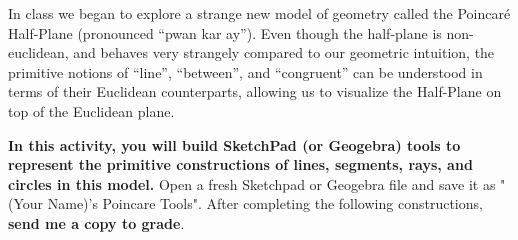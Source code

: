\documentclass{article}
\begin{document}
\HomeworkTitle[class={College Geometry}, number={2}, name={Poincar\'{e} Half-Plane}]

In class we began to explore a strange new model of geometry called the Poincar\'{e} Half-Plane (pronounced ``pwan kar ay''). Even though the half-plane is non-euclidean, and behaves very strangely compared to our geometric intuition, the primitive notions of ``line'', ``between'', and ``congruent'' can be understood in terms of their Euclidean counterparts, allowing us to visualize the Half-Plane on top of the Euclidean plane.

\textbf{In this activity, you will build SketchPad (or Geogebra) tools to represent the primitive constructions of lines, segments, rays, and circles in this model.} Open a fresh Sketchpad or Geogebra file and save it as "(Your Name)'s Poincare Tools". After completing the following constructions, \textbf{send me a copy to grade}.
\end{document}
